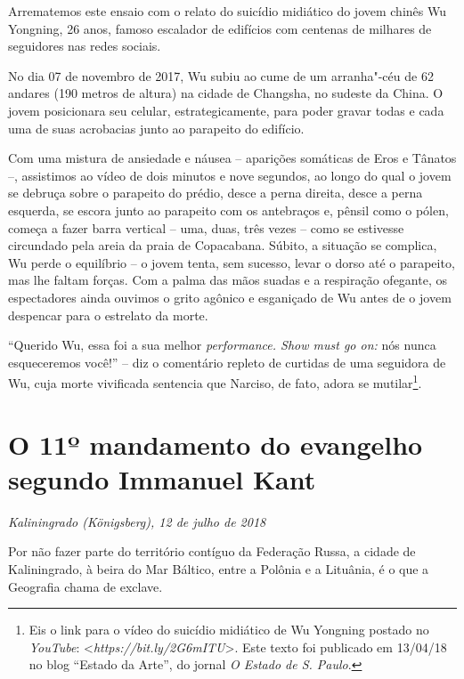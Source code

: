 Arrematemos este ensaio com o relato do suicídio midiático do jovem
chinês Wu Yongning, 26 anos, famoso escalador de edifícios com
centenas de milhares de seguidores nas redes sociais.

No dia 07 de novembro de 2017, Wu subiu ao cume de um arranha"-céu de 62
andares (190 metros de altura) na cidade de Changsha, no sudeste da
China. O jovem posicionara seu celular, estrategicamente, para poder
gravar todas e cada uma de suas acrobacias junto ao parapeito do
edifício.

Com uma mistura de ansiedade e náusea -- aparições somáticas de Eros e
Tânatos --, assistimos ao vídeo de dois minutos e nove segundos, ao
longo do qual o jovem se debruça sobre o parapeito do prédio, desce a
perna direita, desce a perna esquerda, se escora junto ao parapeito com
os antebraços e, pênsil como o pólen, começa a fazer barra vertical --
uma, duas, três vezes -- como se estivesse circundado pela areia da
praia de Copacabana. Súbito, a situação se complica, Wu perde o
equilíbrio -- o jovem tenta, sem sucesso, levar o dorso até o parapeito,
mas lhe faltam forças. Com a palma das mãos suadas e a respiração
ofegante, os espectadores ainda ouvimos o grito agônico e esganiçado de
Wu antes de o jovem despencar para o estrelato da morte.

``Querido Wu, essa foi a sua melhor \emph{performance. Show must go on:}
nós nunca esqueceremos você!'' -- diz o comentário repleto de curtidas
de uma seguidora de Wu, cuja morte vivificada sentencia que Narciso, de
fato, adora se mutilar\footnote{Eis o link para o vídeo do suicídio
  midiático de Wu Yongning postado no \emph{YouTube}: \textless{}\emph{https://bit.ly/2G6mITU}\textgreater{}. Este texto foi publicado em 13/04/18 no blog ``Estado da Arte'', do
  jornal \emph{O Estado de S. Paulo}.}.

\chapter*{O 11º mandamento do evangelho\\segundo Immanuel Kant}

\begin{flushright}
\emph{Kaliningrado (Königsberg), 12 de julho de 2018}
\end{flushright}

Por não fazer parte do território contíguo da Federação Russa, a cidade
de Kaliningrado, à beira do Mar Báltico, entre a Polônia e a Lituânia, é
o que a Geografia chama de exclave.

